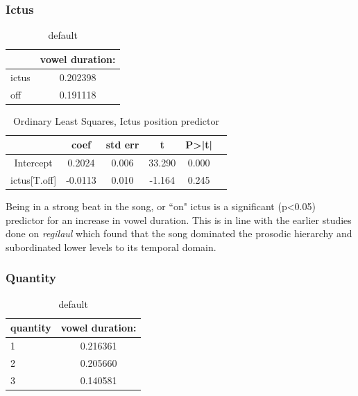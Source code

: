 \documentclass[12pt]{article}
\begin{document}
\subsubsection*{Ictus}
\begin{table}[htp]
\caption{default}
\begin{center}
\begin{tabular}{|l|c|}
\hline
& vowel duration: \\
\hline

ictus &   0.202398 \\
off    &  0.191118 \\
\hline
\end{tabular}
\end{center}
\label{vowel duration \& song position}
\end{table}%
\begin{table}[htbp]
  \centering
  \begin{tabular}{@{} cccccc @{}}
    \toprule
 & coef &	std err &	t & P>|t| \\
    \midrule

	
Intercept	& 0.2024	& 0.006 &	33.290 &	0.000 \\
ictus[T.off]	 &-0.0113	& 0.010 &	-1.164 &	0.245  \\

    \bottomrule
  \end{tabular}
  \caption{Ordinary Least Squares, Ictus position predictor}
  \label{tab:V duration and song position}
\end{table}
Being in a strong beat in the song, or ``on" ictus is a significant (p<0.05) predictor for an increase in vowel duration. This is in line with the earlier studies done on {\it regilaul} which found that the song dominated the prosodic hierarchy and subordinated lower levels to its temporal domain. 
    \pagebreak
\subsubsection*{Quantity} 

\begin{table}[htp]
\caption{default}
\begin{center}
\begin{tabular}{|l|c|}
\hline
 quantity& vowel duration: \\
\hline
\hline 
1  &  0.216361 \\
2   & 0.205660\\
3   & 0.140581\\
\hline
\end{tabular}
\end{center}
\label{quantity \& vowel duration}
\end{table}%
\end{document}
